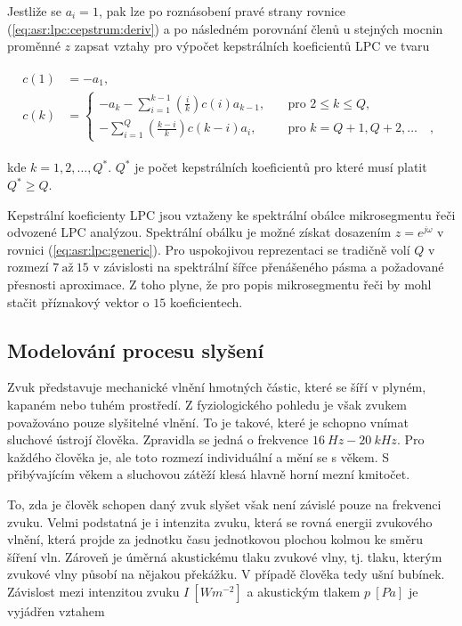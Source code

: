 \noindent Jestliže se $a_i = 1$, pak lze po roznásobení pravé strany rovnice (\ref{eq:asr:lpc:cepstrum:deriv}) a po následném porovnání členů u stejných mocnin proměnné $z$ zapsat vztahy pro výpočet kepstrálních koeficientů LPC ve tvaru

\begin{align}
  \begin{split}
    c(1) &= -a_1, \\
    c(k) &=
    \begin{cases}
      - a_k - \sum_{i=1}^{k-1} \left(\frac{i}{k}\right) c(i) a_{k-1},  & \quad \text{pro } 2 \leq k \leq Q, \\
      - \sum_{i=1}^{Q} \left(\frac{k - i}{k}\right) c(k-i) a_i,  & \quad \text{pro } k = Q + 1, Q + 2, \dots \quad ,
    \end{cases}
  \end{split}
  \label{eq:asr:lpc:cepstrum:coef}
\end{align}

\noindent kde $k = 1, 2, \dots , Q^{*}$. $Q^{*}$ je počet kepstrálních koeficientů pro které musí platit $Q^{*} \geq Q$.

Kepstrální koeficienty LPC jsou vztaženy ke spektrální obálce mikrosegmentu řeči odvozené LPC analýzou. Spektrální obálku je možné získat dosazením $z = e^{j\omega}$ v rovnici (\ref{eq:asr:lpc:generic}). Pro uspokojivou reprezentaci se tradičně volí $Q$ v rozmezí $7\ \text{až}\ 15$ v závislosti na spektrální šířce přenášeného pásma a požadované přesnosti aproximace. Z toho plyne, že pro popis mikrosegmentu řeči by mohl stačit příznakový vektor o $15$ koeficientech.

\subsection{Modelování procesu slyšení}
\label{chap:asr:parametrization:hearing}

Zvuk představuje mechanické vlnění hmotných částic, které se šíří v plyném, kapaném nebo tuhém prostředí. Z fyziologického pohledu je však zvukem považováno pouze slyšitelné vlnění. To je takové, které je schopno vnímat sluchové ústrojí člověka. Zpravidla se jedná o frekvence $16\ Hz - 20\ kHz$. Pro každého člověka je, ale toto rozmezí individuální a mění se s věkem. S přibývajícím věkem a sluchovou zátěží klesá hlavně horní mezní kmitočet. \cite{Psutka2006}

To, zda je člověk schopen daný zvuk slyšet však není závislé pouze na frekvenci zvuku. Velmi podstatná je i intenzita zvuku, která se rovná energii zvukového vlnění, která projde za jednotku času jednotkovou plochou kolmou ke směru šíření vln. Zároveň je úměrná akustickému tlaku zvukové vlny, tj. tlaku, kterým zvukové vlny působí na nějakou překážku. V případě člověka tedy ušní bubínek. Závislost mezi intenzitou zvuku $I\ \left[Wm^{-2}\right]$ a akustickým tlakem $p\ \left[Pa\right]$ je vyjádřen vztahem

